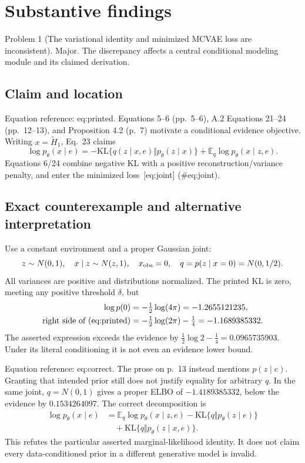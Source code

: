 \documentclass[10pt]{article}
\begin{document}
\section*{Substantive findings}
Problem 1 (The variational identity and minimized MCVAE loss are inconsistent).  Major. The discrepancy affects a central conditional modeling module and its claimed derivation.\par
\subsection*{Claim and location}
Equation reference: eq:printed. Equations 5–6 (pp. 5–6), A.2 Equations 21–24 (pp. 12–13), and Proposition 4.2 (p. 7) motivate a conditional evidence objective. Writing \(x=\widetilde H_1\), Eq. 23 claims \[
 \log p_\theta(x\mid e)
 =-\mathrm{KL}\{q(z\mid x,e)\Vert p_\theta(z\mid x)\}
   +\mathbb E_q\log p_\theta(x\mid z,e).\] Equations 6/24 combine negative KL with a positive reconstruction/variance penalty, and enter the minimized loss [eq:joint] (\#eq:joint).\par
\subsection*{Exact counterexample and alternative interpretation}
Use a constant environment and a proper Gaussian joint: \[z\sim N(0,1),\quad x\mid z\sim N(z,1),\quad
 x_{\rm obs}=0,\quad q=p(z\mid x=0)=N(0,1/2).\] All variances are positive and distributions normalized. The printed KL is zero, meeting any positive threshold \(\delta\), but \[\begin{aligned}
 \log p(0)&=-\tfrac12\log(4\pi)=-1.2655121235,\\
 \text{right side of \text{(eq:printed)}}
 &=-\tfrac12\log(2\pi)-\tfrac14=-1.1689385332.\end{aligned}\] The asserted expression exceeds the evidence by \(\frac12\log2-\frac14=0.0965735903\). Under its literal conditioning it is not even an evidence lower bound.\par
Equation reference: eq:correct. The prose on p. 13 instead mentions \(p(z\mid e)\). Granting that intended prior still does not justify equality for arbitrary \(q\). In the same joint, \(q=N(0,1)\) gives a proper ELBO of \(-1.4189385332\), below the evidence by \(0.1534264097\). The correct decomposition is \[\begin{aligned}

 \log p_\theta(x\mid e)
 &=\mathbb E_q\log p_\theta(x\mid z,e)
   -\mathrm{KL}\{q\Vert p_\theta(z\mid e)\}\\
 &\quad+\mathrm{KL}\{q\Vert p_\theta(z\mid x,e)\}.\nonumber\end{aligned}\] This refutes the particular asserted marginal-likelihood identity. It does not claim every data-conditioned prior in a different generative model is invalid.\par
\end{document}
